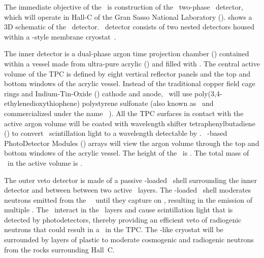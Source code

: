 The immediate objective of the \GADMC\ is construction of the \DSks\ two-phase \LAr\ detector, which will operate in Hall-C of the Gran Sasso National Laboratory (\LNGS).   shows a 3D schematic of the \DSks\ detector. \DSks\ detector consists of two nested detectors housed within a \pDUNE-style membrane cryostat~\cite{Abi:2017wp,Acciarri:2016wz}.  

The inner detector is a dual-phase argon time projection chamber (\LArTPC) contained within a vessel made from ultra-pure  acrylic (\PMMA) and filled with \UAr.  The central active volume of the TPC is defined by eight vertical reflector panels and the top and bottom windows of the acrylic vessel. Instead of the traditional copper field cage rings and Indium-Tin-Oxide (\ITO) cathode and anode, \DSks\ will use poly(3,4-ethylenedioxythiophene) polystyrene sulfonate (also known as \PEDOT\ and commercialized under the name \Clevios~\cite{HeraeusDeutschlandGmbHandCOKg:2019wt}). All the TPC surfaces in contact with the active argon volume will be coated with  wavelength shifter tetraphenylbutadiene (\TPB) to convert \LAr\ scintillation light to a wavelength detectable by \SiPMs.  \DSkTilesNumber\ \SiPM-based PhotoDetector Modules (\DSkPdm) arrays will view the argon volume through the top and bottom windows of the acrylic vessel. The height of the \TPC\ is \DSkTPCHeight. The total mass of \LAr\ in the active volume is \DSkActiveMass.

The outer veto detector is made of a passive -loaded \PMMA\ shell surrounding the inner detector and between between two active \AAr\ layers.  The -loaded \PMMA\ shell moderates neutrons emitted from the \LAr\ \TPC\ until they capture on , resulting in the emission of multiple \grs.  The \grs\ interact in the \AAr\ layers and cause scintillation light that is detected by photodetectors, thereby providing an efficient veto of radiogenic neutrons that could result in a \NR\ in the TPC.  The \pDUNE-like cryostat will be surrounded by layers of plastic to moderate cosmogenic and radiogenic neutrons from the rocks surrounding Hall~C.


